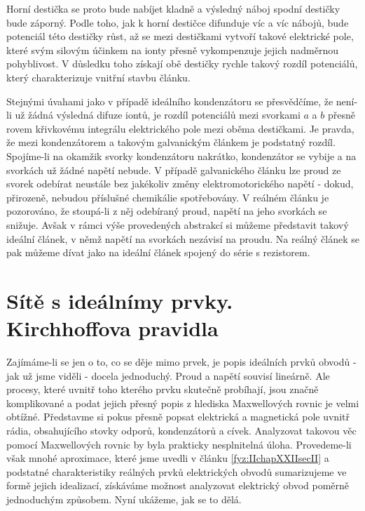 {  Horní destička se proto bude nabíjet kladně a výsledný náboj spodní destičky bude záporný. Podle 
  toho, jak k horní destičce difunduje víc a víc nábojů, bude potenciál této destičky růst, až se 
  mezi destičkami vytvoří takové elektrické pole, které svým silovým účinkem na ionty přesně 
  vykompenzuje jejich nadměrnou pohyblivost. V důsledku toho získají obě destičky rychle takový 
  rozdíl potenciálů, který charakterizuje vnitřní stavbu článku.
  
  Stejnými úvahami jako v případě ideálního kondenzátoru se přesvědčíme, že není-li už žádná 
  výsledná difuze iontů, je rozdíl potenciálů mezi svorkami \(a\) a \(b\) přesně rovem křivkovému 
  integrálu elektrického pole mezi oběma destičkami. Je pravda, že mezi kondenzátorem a takovým 
  galvanickým článkem je podstatný rozdíl. Spojíme-li na okamžik svorky kondenzátoru nakrátko, 
  kondenzátor se vybije a na svorkách už žádné napětí nebude. V případě galvanického článku lze 
  proud ze svorek odebírat neustále bez jakékoliv změny elektromotorického napětí - dokud, 
  přirozeně, nebudou příslušné chemikálie spotřebovány. V reálném článku je pozorováno, že 
  stoupá-li z něj odebíraný proud, napětí na jeho svorkách se snižuje. Avšak v rámci výše 
  provedených abstrakcí si můžeme představit takový ideální článek, v němž napětí na svorkách 
  nezávisí na proudu. Na reálný článek se pak můžeme dívat jako na ideální článek spojený do série 
  s rezistorem.
  
\section{Sítě s ideálnímy prvky. Kirchhoffova pravidla}\label{fyz:IIchapXXIIsecIII}
  Zajímáme-li se jen o to, co se děje mimo prvek, je popis ideálních prvků obvodů - jak už jsme 
  viděli - docela jednoduchý. Proud a napětí souvisí lineárně. Ale procesy, které uvnitř toho 
  kterého prvku skutečně probíhají, jsou značně komplikované a podat jejich přesný popis z hlediska 
  Maxwellových rovnic je velmi obtížné. Představme si pokus přesně popsat elektrická a magnetická 
  pole uvnitř rádia, obsahujícího stovky odporů, kondenzátorů a cívek. Analyzovat takovou věc 
  pomocí Maxwellových rovnic by byla prakticky nesplnitelná úloha. Provedeme-li však mnohé 
  aproximace, které jsme uvedli v článku \ref{fyz:IIchapXXIIsecII} a podstatné charakteristiky 
  reálných prvků elektrických obvodů sumarizujeme ve formě jejich idealizací, získáváme možnost 
  analyzovat elektrický obvod poměrně jednoduchým způsobem. Nyní ukážeme, jak se to dělá.
  
}

